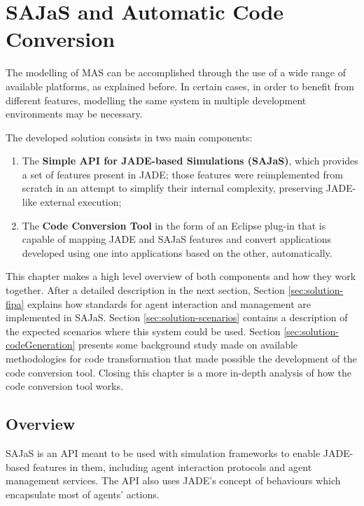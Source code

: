 \chapter{SAJaS and Automatic Code Conversion}
\label{chap:solution}

The modelling of MAS can be accomplished through the use of a wide range of available platforms, as explained before. In certain cases, in order to benefit from different features, modelling the same system in multiple development environments may be necessary.

The developed solution consists in two main components:

\begin{enumerate}
  \item The \textbf{Simple API for JADE-based Simulations (SAJaS)}, which provides a set of features present in JADE; those features were reimplemented from scratch in an attempt to simplify their internal complexity, preserving JADE-like external execution;
  \item The \textbf{Code Conversion Tool} in the form of an Eclipse plug-in that is capable of mapping JADE and SAJaS features and convert applications developed using one into applications based on the other, automatically.
\end{enumerate}

This chapter makes a high level overview of both components and how they work together. After a detailed description in the next section, Section \ref{sec:solution-fipa} explains how standards for agent interaction and management are implemented in SAJaS. Section \ref{sec:solution-scenarios} contains a description of the expected scenarios where this system could be used. Section \ref{sec:solution-codeGeneration} presents some background study made on available methodologies for code transformation that made possible the development of the code conversion tool. Closing this chapter is a more in-depth analysis of how the code conversion tool works.

\section{Overview}
\label{sec:solution-overview}

SAJaS is an API meant to be used with simulation frameworks to enable JADE-based features in them, including agent interaction protocols and agent management services. The API also uses JADE's concept of behaviours which encapsulate most of agents' actions.

